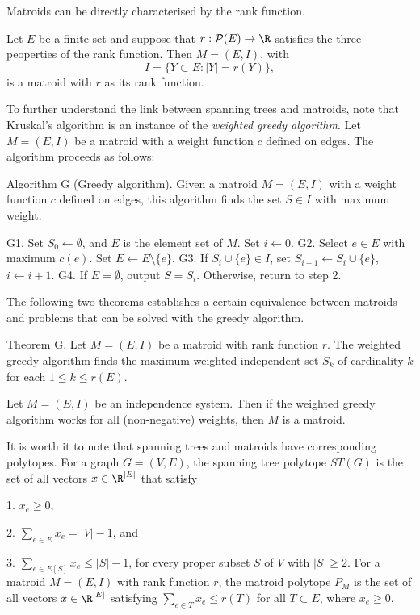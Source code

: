Matroids can be directly characterised by the rank function.

 Let $E$ be a finite set and suppose that $r : {\cal P}(E)\rightarrow \R$ satisfies the three peoperties of the rank function. Then $M=(E,I)$, with
$$I = \{Y \subset E : |Y| = r(Y)\},$$
is a matroid with $r$ as its rank function.

To further understand the link between spanning trees and matroids, note that Kruskal's algorithm is an instance of the {\it weighted greedy algorithm}. Let $M=(E,I)$ be a matroid with a weight function $c$ defined on edges. The algorithm proceeds as follows:

\algbegin Algorithm G (Greedy algorithm). Given a matroid $M=(E,I)$ with a weight function $c$ defined on edges, this algorithm finds the set $S\in I$ with maximum weight.

\algstep G1. Set $S_0\gets\emptyset$, and $E$ is the element set of $M$. Set $i\gets 0$.
\algstep G2. Select $e\in E$ with maximum $c(e)$. Set $E\gets E\setminus\{e\}$.
\algstep G3. If $S_i\cup\{e\}\in I$, set $S_{i+1}\gets S_i\cup\{e\}$, $i\gets i + 1$.
\algstep G4. If $E = \emptyset$, output $S = S_i$. Otherwise, return to step 2.\slug

The following two theorems establishes a certain equivalence between matroids and problems that can be solved with the greedy algorithm.

\proclaim Theorem G. Let $M=(E,I)$ be a matroid with rank function $r$. The weighted greedy algorithm finds the maximum weighted independent set $S_k$ of cardinality $k$ for each $1\leq k\leq r(E)$.\slug

 Let $M=(E,I)$ be an independence system. Then if the weighted greedy algorithm works for all (non-negative) weights, then $M$ is a matroid.\slug

It is worth it to note that spanning trees and matroids have corresponding polytopes. For a graph $G=(V,E)$, the spanning tree polytope $ST(G)$ is the set of all vectors $x\in \R^{|E|}$ that satisfy
\medskip
\item {1.} $x_e \geq 0$,
\smallskip
\item {2.} $\displaystyle\sum_{e\in E} x_e = |V| - 1$, and
\smallskip
\item {3.} $\displaystyle\sum_{e\in E[S]} x_e \leq |S| - 1$, for every proper subset $S$ of $V$ with $|S| \geq 2$.
\medskip
For a matroid $M=(E,I)$ with rank function $r$, the matroid polytope $P_M$ is the set of all vectors $x\in \R^{|E|}$ satisfying $\sum_{e\in T} x_e \leq r(T)$ for all $T\subset E$, where $x_e\geq 0$.

